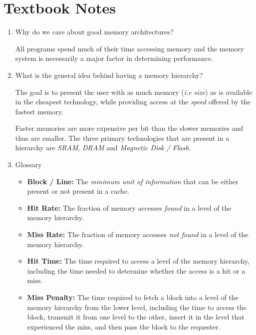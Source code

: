 \documentclass[12pt]{article}
\newenvironment{QandA}{\begin{enumerate}[label=\bfseries\arabic*.]\bfseries}
                      {\end{enumerate}}
\newenvironment{answered}{\par\quad\normalfont}{}
\begin{document}
\newpage 

\section{Textbook Notes}

\begin{QandA}

\item Why do we care about good memory architectures?
\begin{answered}
All programs spend much of their time accessing memory and the memory system is necessarily a major factor in determining performance.
\end{answered}

\item What is the general idea behind having a memory hierarchy?
\begin{answered}
The goal is to present the user with as much memory (\textit{i.e size}) as is available in the cheapest technology, while providing access at the \textit{speed} offered by the fastest memory.

\quad Faster memories are more expensive per bit than the slower memories and thus are smaller. The three primary technologies that are present in a hierarchy are \textit{SRAM}, \textit{DRAM} and \textit{Magnetic Disk / Flash}. 
\end{answered}

\item Glossary
\begin{answered}
\vspace{-0.85cm}
\begin{itemize}
    \item \textbf{Block / Line:} The \textit{minimum unit of information} that can be either present or not present in a cache.
    \item \textbf{Hit Rate:} The fraction of memory accesses \textit{found} in a level of the memory hierarchy.
    \item \textbf{Miss Rate:} The fraction of memory accesses \textit{not found} in a level of the memory hierarchy.
    \item \textbf{Hit Time:} The time required to access a level of the memory hierarchy, including the time needed to determine whether the access is a hit or a miss.
    \item \textbf{Miss Penalty:} The time required to fetch a block into a level of the memory hierarchy from the lower level, including the time to access the block, transmit it from one level to the other, insert it in the level that experienced the miss, and then pass the block to the requester.
\end{itemize}
\end{answered}


\end{QandA}
\end{document}
